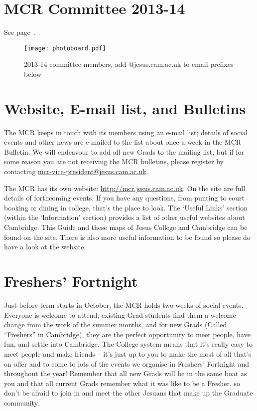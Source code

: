 \documentclass[11pt,fleqn, oneside]{book} %
\begin{document}

\section{MCR Committee 2013-14}

See page~\pageref{comms}.

\begin{figure}[!htbp]
\centering
\texttt{[image: photoboard.pdf]}
\caption{2013-14 committee members, add @jesus.cam.ac.uk to email prefixes below}
\label{comms}
\end{figure}



\section{Website, E-mail list, and Bulletins}

The MCR keeps in touch with its members using an e-mail list; details of social events and other news are e-mailed to the list about once a week in the MCR Bulletin. We will endeavour to add all new Grads to the mailing list, but if for some reason you are not receiving the MCR bulletins, please register by contacting \url{mcr-vice-president@jesus.cam.ac.uk}.

The MCR has its own website: \url{http://mcr.jesus.cam.ac.uk}. On the site are full details of forthcoming events. If you have any questions, from punting to court booking or dining in college, that’s the place to look. The ‘Useful Links’ section (within the ‘Information’ section) provides a list of other useful websites about Cambridge. This Guide and these maps of Jesus College and Cambridge can be found on the site. There is also more useful information to be found so please do have a look at the website.

\section{Freshers' Fortnight }

Just before term starts in October, the MCR holds two weeks of social events. Everyone is welcome to attend; existing Grad students find them a welcome change from the work of the summer months, and for new Grads (Called ``Freshers'' in Cambridge), they are the perfect opportunity to meet people, have fun, and settle into Cambridge. The College system means that it’s really easy to meet people and make friends – it’s just up to you to make the most of all that’s on offer and to come to lots of the events we organise in Freshers’ Fortnight and throughout the year!    Remember that all new Grads will be in the same boat as you and that all current Grads remember what it was like to be a Fresher, so don’t be afraid to join in and meet the other Jesuans that make up the Graduate community.  
\end{document}
